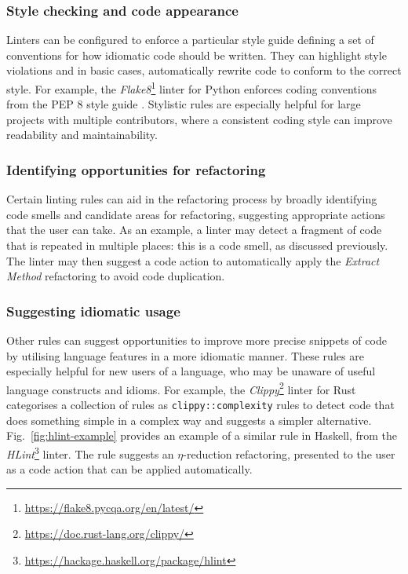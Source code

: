 \subsubsection{Style checking and code appearance}
Linters can be configured to enforce a particular style guide defining a set of conventions for how idiomatic code should be written.
They can highlight style violations and in basic cases, automatically rewrite code to conform to the correct style.
For example, the \textit{Flake8}\footnote{\url{https://flake8.pycqa.org/en/latest/}} linter for Python enforces coding conventions from the PEP 8 style guide \cite{van_rossum_pep8_2001}.
Stylistic rules are especially helpful for large projects with multiple contributors, where a consistent coding style can improve readability and maintainability.

\subsubsection{Identifying opportunities for refactoring}
Certain linting rules can aid in the refactoring process by broadly identifying code smells and candidate areas for refactoring, suggesting appropriate actions that the user can take.
As an example, a linter may detect a fragment of code that is repeated in multiple places: this is a code smell, as discussed previously.
The linter may then suggest a code action to automatically apply the \textit{Extract Method} refactoring to avoid code duplication.

\subsubsection{Suggesting idiomatic usage}
Other rules can suggest opportunities to improve more precise snippets of code by utilising language features in a more idiomatic manner.
These rules are especially helpful for new users of a language, who may be unaware of useful language constructs and idioms.
For example, the \textit{Clippy}\footnote{\url{https://doc.rust-lang.org/clippy/}} linter for Rust \cite{li_clippy_2023} categorises a collection of rules as \texttt{clippy::complexity} rules to detect code that does something simple in a complex way and suggests a simpler alternative.
Fig.~\ref{fig:hlint-example} provides an example of a similar rule in Haskell, from the \textit{HLint}\footnote{\url{https://hackage.haskell.org/package/hlint}} linter.
The rule suggests an $\eta$-reduction refactoring, presented to the user as a code action that can be applied automatically.

